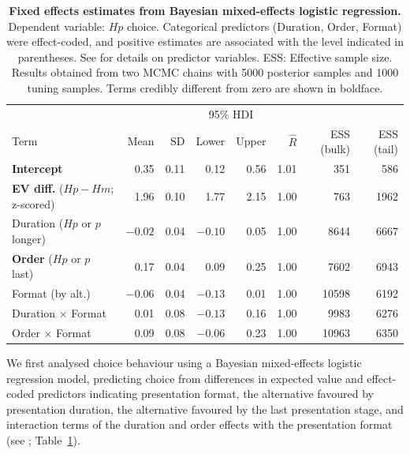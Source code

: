 \documentclass[11pt, a4paper, twocolumn, abstract]{scrartcl}
\begin{document}
\begin{table}[tb!]
    \centering
    {
        \begin{tabular}{lrrrrrrr}
            \toprule
            \multicolumn{1}{c}{} & \multicolumn{1}{c}{} & \multicolumn{1}{c}{} & \multicolumn{2}{c}{95\% HDI} & \multicolumn{1}{c}{} & \multicolumn{1}{c}{} & \multicolumn{1}{c}{} \\
            \cline{4-5}
            Term & Mean & SD & Lower & Upper & $\hat{R}$ & ESS (bulk) & ESS (tail)  \\
            \cmidrule[0.4pt]{1-8}
            \textbf{Intercept} & 0.35 & 0.11 & 0.12 & 0.56 & 1.01 & 351 & 586  \\
            \textbf{EV diff.} ($Hp - Hm$; z-scored) & 1.96 & 0.10 & 1.77 & 2.15 & 1.00 & 763 & 1962  \\
            Duration ($Hp$ or $p$ longer) & $-0.02$ & 0.04 & $-0.10$ & 0.05 & 1.00 & 8644 & 6667  \\
            \textbf{Order} ($Hp$ or $p$ last) & 0.17 & 0.04 & 0.09 & 0.25 & 1.00 & 7602 & 6943  \\
            Format (by alt.) & $-0.06$ & 0.04 & $-0.13$ & 0.01 & 1.00 & 10598 & 6192  \\
            Duration $\times$ Format & 0.01 & 0.08 & $-0.13$ & 0.16 & 1.00 & 9983 & 6276  \\
            Order $\times$ Format & 0.09 & 0.08 & $-0.06$ & 0.23 & 1.00 & 10963 & 6350  \\
            \bottomrule
        \end{tabular}
    }
    \caption{\textbf{Fixed effects estimates from Bayesian mixed-effects logistic regression.} Dependent variable: $Hp$ choice. Categorical predictors (Duration, Order, Format) were effect-coded, and positive estimates are associated with the level indicated in parentheses. See  for details on predictor variables. ESS: Effective sample size. Results obtained from two MCMC chains with 5000 posterior samples and 1000 tuning samples. Terms credibly different from zero are shown in boldface.}
    \label{tab:regression}
\end{table}

We first analysed choice behaviour using a Bayesian mixed-effects logistic regression model, predicting choice from differences in expected value and effect-coded predictors indicating presentation format, the alternative favoured by presentation duration, the alternative favoured by the last presentation stage, and interaction terms of the duration and order effects with the presentation format (see ; Table~\ref{tab:regression}).
\end{document}
